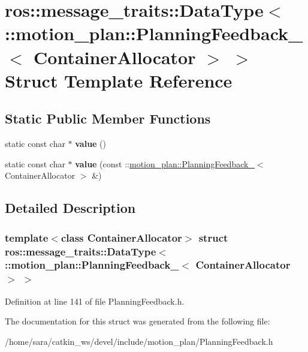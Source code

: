 \hypertarget{structros_1_1message__traits_1_1DataType_3_01_1_1motion__plan_1_1PlanningFeedback___3_01ContainerAllocator_01_4_01_4}{}\section{ros\+:\+:message\+\_\+traits\+:\+:Data\+Type$<$ \+:\+:motion\+\_\+plan\+:\+:Planning\+Feedback\+\_\+$<$ Container\+Allocator $>$ $>$ Struct Template Reference}
\label{structros_1_1message__traits_1_1DataType_3_01_1_1motion__plan_1_1PlanningFeedback___3_01ContainerAllocator_01_4_01_4}
\subsection*{Static Public Member Functions}
\begin{DoxyCompactItemize}
\item 
\mbox{\label{structros_1_1message__traits_1_1DataType_3_01_1_1motion__plan_1_1PlanningFeedback___3_01ContainerAllocator_01_4_01_4_a206d6e829e08aef51ecd6c648376754e}} 
static const char $\ast$ {\bfseries value} ()
\item 
\mbox{\label{structros_1_1message__traits_1_1DataType_3_01_1_1motion__plan_1_1PlanningFeedback___3_01ContainerAllocator_01_4_01_4_ae8d779297e97adfd24f66e2357c94e79}} 
static const char $\ast$ {\bfseries value} (const \+::\hyperlink{structmotion__plan_1_1PlanningFeedback__}{motion\+\_\+plan\+::\+Planning\+Feedback\+\_\+}$<$ Container\+Allocator $>$ \&)
\end{DoxyCompactItemize}


\subsection{Detailed Description}
\subsubsection*{template$<$class Container\+Allocator$>$\newline
struct ros\+::message\+\_\+traits\+::\+Data\+Type$<$ \+::motion\+\_\+plan\+::\+Planning\+Feedback\+\_\+$<$ Container\+Allocator $>$ $>$}



Definition at line 141 of file Planning\+Feedback.\+h.



The documentation for this struct was generated from the following file\+:\begin{DoxyCompactItemize}
\item 
/home/sara/catkin\+\_\+ws/devel/include/motion\+\_\+plan/Planning\+Feedback.\+h\end{DoxyCompactItemize}
